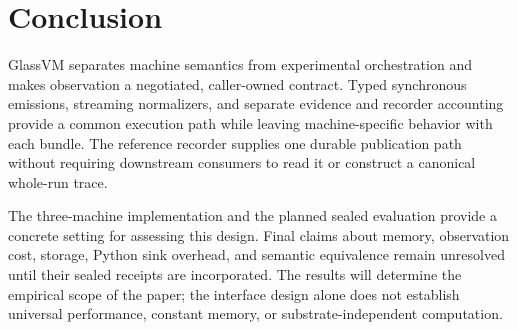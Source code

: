 \section{Conclusion}

GlassVM separates machine semantics from experimental orchestration and
makes observation a negotiated, caller-owned contract. Typed synchronous
emissions, streaming normalizers, and separate evidence and recorder
accounting provide a common execution path while leaving machine-specific
behavior with each bundle. The reference recorder supplies one durable
publication path without requiring downstream consumers to read it or
construct a canonical whole-run trace.

The three-machine implementation and the planned sealed evaluation provide
a concrete setting for assessing this design. Final claims about memory,
observation cost, storage, Python sink overhead, and semantic equivalence
remain unresolved until their sealed receipts are incorporated. The results
will determine the empirical scope of the paper; the interface design alone
does not establish universal performance, constant memory, or
substrate-independent computation.
